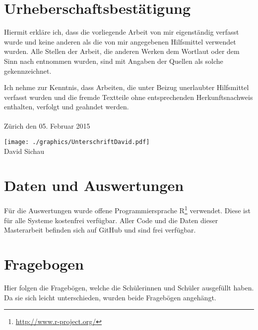 

\section{Urheberschaftsbestätigung}

Hiermit erkläre ich, dass die vorliegende Arbeit von mir eigenständig verfasst wurde und keine anderen als die von mir angegebenen Hilfsmittel verwendet wurden. Alle Stellen der Arbeit, die anderen Werken dem Wortlaut oder dem Sinn nach entnommen wurden, sind mit Angaben der Quellen als solche gekennzeichnet.

Ich nehme zur Kenntnis, dass Arbeiten, die unter Beizug unerlaubter Hilfsmittel verfasst wurden und die fremde Textteile ohne entsprechenden Herkunftsnachweis enthalten, verfolgt und geahndet werden.
\\
\\Zürich den 05. Februar 2015


\texttt{[image: ./graphics/UnterschriftDavid.pdf]}\\
David Sichau



\section{Daten und Auswertungen}

Für die Auswertungen wurde offene Programmiersprache R\footnote{\url{http://www.r-project.org/}} verwendet. Diese ist für alle  Systeme kostenfrei verfügbar. Aller Code und die Daten dieser Masterarbeit befinden sich auf GitHub und sind frei verfügbar.



\section{Fragebogen}
Hier folgen die Fragebögen, welche die Schülerinnen und Schüler ausgefüllt haben. Da sie sich leicht unterschieden, wurden beide Fragebögen angehängt.

 
 
 
 



